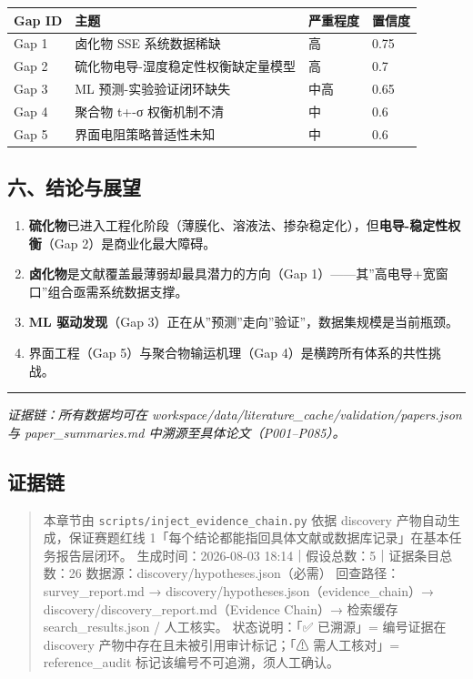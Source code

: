 \documentclass[12pt,a4paper]{ctexart}
\providecommand{\tightlist}{%
  \setlength{\itemsep}{0pt}\setlength{\parskip}{0pt}}
\begin{document}
{\def\LTcaptype{none} %
\begin{longtable}[]{@{}llll@{}}
\toprule\noalign{}
Gap ID & 主题 & 严重程度 & 置信度 \\
\midrule\noalign{}
\endhead
\bottomrule\noalign{}
\endlastfoot
Gap 1 & 卤化物 SSE 系统数据稀缺 & 高 & 0.75 \\
Gap 2 & 硫化物电导-湿度稳定性权衡缺定量模型 & 高 & 0.7 \\
Gap 3 & ML 预测-实验验证闭环缺失 & 中高 & 0.65 \\
Gap 4 & 聚合物 t+-σ 权衡机制不清 & 中 & 0.6 \\
Gap 5 & 界面电阻策略普适性未知 & 中 & 0.6 \\
\end{longtable}
}

\subsection{六、结论与展望}\label{ux516dux7ed3ux8bbaux4e0eux5c55ux671b}

\begin{enumerate}
\def\labelenumi{\arabic{enumi}.}
\tightlist
\item
  \textbf{硫化物}已进入工程化阶段（薄膜化、溶液法、掺杂稳定化），但\textbf{电导-稳定性权衡}（Gap 2）是商业化最大障碍。
\item
  \textbf{卤化物}是文献覆盖最薄弱却最具潜力的方向（Gap 1）------其''高电导+宽窗口''组合亟需系统数据支撑。
\item
  \textbf{ML 驱动发现}（Gap 3）正在从''预测''走向''验证''，数据集规模是当前瓶颈。
\item
  界面工程（Gap 5）与聚合物输运机理（Gap 4）是横跨所有体系的共性挑战。
\end{enumerate}

\begin{center}\rule{0.5\linewidth}{0.5pt}\end{center}

\emph{证据链：所有数据均可在 workspace/data/literature\_cache/validation/papers.json 与 paper\_summaries.md 中溯源至具体论文（P001--P085）。}

\subsection{证据链}\label{ux8bc1ux636eux94fe}

\begin{quote}
本章节由 \texttt{scripts/inject\_evidence\_chain.py} 依据 discovery 产物自动生成，保证赛题红线 1「每个结论都能指回具体文献或数据库记录」在基本任务报告层闭环。 生成时间：2026-08-03 18:14｜假设总数：5｜证据条目总数：26 数据源：discovery/hypotheses.json（必需） 回查路径：survey\_report.md → discovery/hypotheses.json（evidence\_chain）→ discovery/discovery\_report.md（Evidence Chain）→ 检索缓存 search\_results.json / 人工核实。 状态说明：「✅ 已溯源」= 编号证据在 discovery 产物中存在且未被引用审计标记；「⚠ 需人工核对」= reference\_audit 标记该编号不可追溯，须人工确认。
\end{quote}
\end{document}
